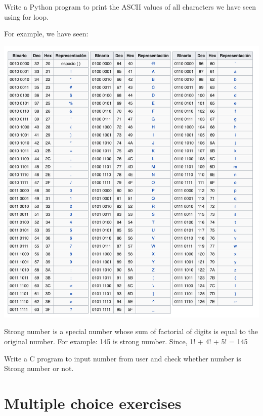 \begin{exercise}

Write a Python program to print the ASCII values of all characters we have seen using for loop. 

For example, we have seen:

\includegraphics[]{book/Spanish/03_Conditionals_if_elif_else/images/ASCII.png}

\end{exercise}

\begin{exercise}
Strong number is a special number whose sum of factorial of digits is equal to the original number.
For example: 145 is strong number. Since, 1! + 4! + 5! = 145

Write a C program to input number from user and check whether number is Strong number or not. 
\end{exercise}



\section*{Multiple choice exercises}

